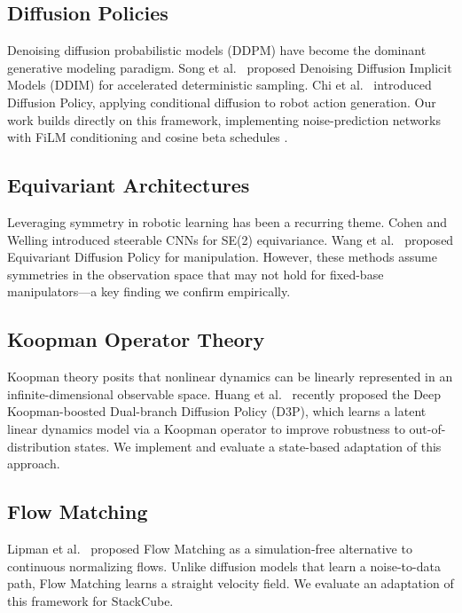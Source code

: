 \documentclass[twocolumn]{article}
\begin{document}
\subsection{Diffusion Policies}
Denoising diffusion probabilistic models (DDPM) \cite{ho2020denoising} have become the dominant generative modeling paradigm. Song et al.\ \cite{song2021ddim} proposed Denoising Diffusion Implicit Models (DDIM) for accelerated deterministic sampling. Chi et al.\ \cite{chi2023diffusion} introduced Diffusion Policy, applying conditional diffusion to robot action generation. Our work builds directly on this framework, implementing noise-prediction networks with FiLM conditioning and cosine beta schedules \cite{nichol2021improved}.

\subsection{Equivariant Architectures}
Leveraging symmetry in robotic learning has been a recurring theme. Cohen and Welling \cite{cohen2016steerable} introduced steerable CNNs for SE(2) equivariance. Wang et al.\ \cite{wang2022equivariant} proposed Equivariant Diffusion Policy for manipulation. However, these methods assume symmetries in the observation space that may not hold for fixed-base manipulators---a key finding we confirm empirically.

\subsection{Koopman Operator Theory}
Koopman theory \cite{koopman1931hamiltonian} posits that nonlinear dynamics can be linearly represented in an infinite-dimensional observable space. Huang et al.\ \cite{huang2025d3p} recently proposed the Deep Koopman-boosted Dual-branch Diffusion Policy (D3P), which learns a latent linear dynamics model via a Koopman operator to improve robustness to out-of-distribution states. We implement and evaluate a state-based adaptation of this approach.

\subsection{Flow Matching}
Lipman et al.\ \cite{lipman2023flowmatching} proposed Flow Matching as a simulation-free alternative to continuous normalizing flows. Unlike diffusion models that learn a noise-to-data path, Flow Matching learns a straight velocity field. We evaluate an adaptation of this framework for StackCube.
\end{document}
